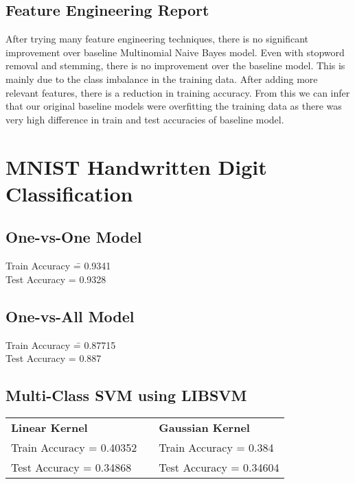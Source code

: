 \documentclass[12pt]{article}
\begin{document}
\subsection*{Feature Engineering Report}
\begin{addmargin}[0.3in]{0in}
After trying many feature engineering techniques, there is no significant improvement over baseline Multinomial Naive Bayes model. Even with stopword removal and stemming, there is no improvement over the baseline model. This is mainly due to the class imbalance in the training data. After adding more relevant features, there is a reduction in training accuracy. From this we can infer that our original baseline models were overfitting the training data as there was very high difference in train and test accuracies of baseline model.
\end{addmargin}

\section*{MNIST Handwritten Digit Classification}
\subsection*{One-vs-One Model}
\begin{addmargin}[0.3in]{0in}
\begin{tabbing}
Train Accuracy \= = 0.9341\\
Test Accuracy \> = 0.9328
\end{tabbing}
\end{addmargin}
\subsection*{One-vs-All Model}
\begin{addmargin}[0.3in]{0in}
\begin{tabbing}
Train Accuracy \= = 0.87715\\
Test Accuracy \> = 0.887
\end{tabbing}
\end{addmargin}
\subsection*{Multi-Class SVM using LIBSVM}
\begin{addmargin}[0.3in]{0in}
\begin{tabular}{lcl}
\textbf{Linear Kernel}      & \hspace{20mm} & \textbf{Gaussian Kernel}    \\
Train Accuracy = 0.40352 & \hspace{20mm} & Train Accuracy = 0.384   \\
Test Accuracy \hspace{2pt}  = 0.34868 & \hspace{20mm} & Test Accuracy \hspace{2pt} = 0.34604 \\
\end{tabular}
\end{addmargin}
\end{document}
